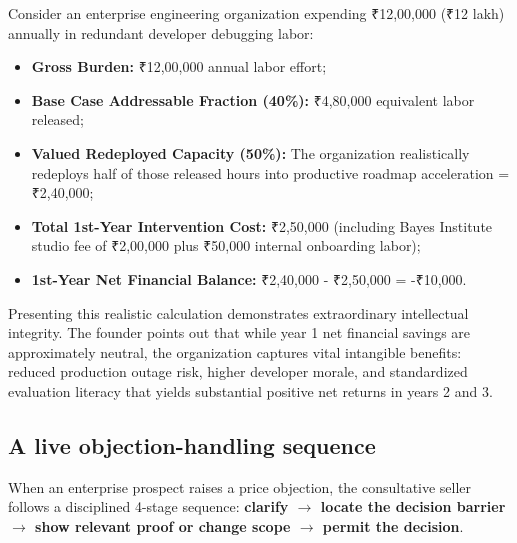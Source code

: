 Consider an enterprise engineering organization expending ₹12,00,000 (₹12 lakh) annually in redundant developer debugging labor:
\begin{itemize}
\item \textbf{Gross Burden:} ₹12,00,000 annual labor effort;
\item \textbf{Base Case Addressable Fraction (40\%):} ₹4,80,000 equivalent labor released;
\item \textbf{Valued Redeployed Capacity (50\%):} The organization realistically redeploys half of those released hours into productive roadmap acceleration = ₹2,40,000;
\item \textbf{Total 1st-Year Intervention Cost:} ₹2,50,000 (including Bayes Institute studio fee of ₹2,00,000 plus ₹50,000 internal onboarding labor);
\item \textbf{1st-Year Net Financial Balance:} ₹2,40,000 - ₹2,50,000 = -₹10,000.
\end{itemize}
Presenting this realistic calculation demonstrates extraordinary intellectual integrity. The founder points out that while year 1 net financial savings are approximately neutral, the organization captures vital intangible benefits: reduced production outage risk, higher developer morale, and standardized evaluation literacy that yields substantial positive net returns in years 2 and 3.

\subsection{A live objection-handling sequence}

When an enterprise prospect raises a price objection, the consultative seller follows a disciplined 4-stage sequence: \textbf{clarify $\to$ locate the decision barrier $\to$ show relevant proof or change scope $\to$ permit the decision}.

